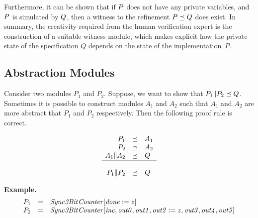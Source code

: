 \mypar
\noindent
Furthermore, it can be shown that if ${P}$ does not have any private 
variables, and ${P}$ is simulated by ${Q}$, then a witness to the 
refinement ${P} \preceq {Q}$ does exist.
In summary, the creativity required from the human verification expert is the
construction of a suitable witness module, which makes explicit how the
private state of the specification $Q$ depends on the state of the
implementation~$P$.

\subsection{Abstraction Modules}
Consider two modules $P_1$ and $P_2$. Suppose, we want to show that
$P_1 \| P_2 \preceq Q$. Sometimes it is possible to construct modules
$A_1$ and $A_2$ such that $A_1$ and $A_2$ are more abstract that $P_1$
and $P_2$ respectively. Then the following proof rule is correct. 

\[
\begin{array}{rcl}
P_1 & \preceq & A_1 \\
P_2 & \preceq & A_2 \\
A_1 \| A_2 & \preceq & Q \\
\hline \\
P_1 \| P_2 & \preceq & Q
\end{array}
\]

{\bf Example.} \\
\[
\begin{array}{rcl}
P_1 & = & {\it Sync\-3Bit\-Counter\/}[{\it done\/} := z] \\
P_2 & = & {\it Sync\-3Bit\-Counter\/}[{\it inc\/}, {\it out0\/},{\it out1\/}, {\it out2\/} := z, {\it out3\/}, {\it out4\/}, {\it out5\/}] 
\end{array}
\]

